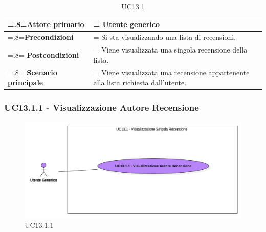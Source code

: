             \begin{table}[H]
                \centering
                \renewcommand{\arraystretch}{1.8}
                \renewcommand\tabularxcolumn[1]{m{#1}}
                \begin{tabularx}{0.9\textwidth} {
                    >{\hsize=.8\hsize\linewidth=\hsize}X
                    >{\hsize=1.2\hsize\linewidth=\hsize}X}
                    \hline
                    \textbf{Attore primario} & Utente generico \\
                    \hline
                    \textbf{Precondizioni} & Si sta visualizzando una lista di recensioni. \\
                    \hline
                    \textbf{Postcondizioni} & Viene visualizzata una singola recensione della lista. \\
                    \hline
                    \textbf{Scenario principale} & Viene visualizzata una recensione appartenente alla lista richiesta dall'utente. \\
                    \hline
                \end{tabularx}
                \caption{UC13.1}
            \end{table}

        \subsubsection{UC13.1.1 - Visualizzazione Autore Recensione}
        \label{UC13.1.1}

            \begin{figure}[H]
                \centering
                \includegraphics[scale=0.6]{src/img/UC13.1.1.png}
                \caption{UC13.1.1}
            \end{figure}

